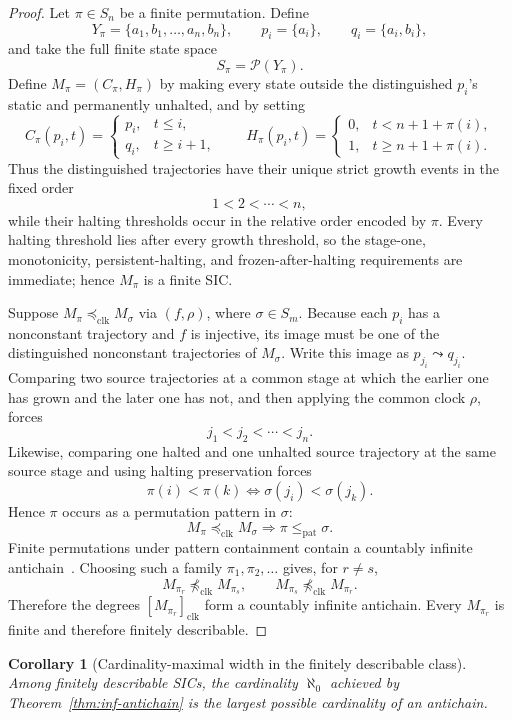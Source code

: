 \documentclass[11pt]{article}
\newtheorem{corollary}[definition]{Corollary}
\theoremstyle{remark}
\newcommand{\preclk}{\preceq_{\mathrm{clk}}}
\begin{document}
\begin{proof}
Let \(\pi\in S_n\) be a finite permutation. Define
\[
Y_\pi=\{a_1,b_1,\ldots,a_n,b_n\},
\qquad
p_i=\{a_i\},
\qquad
q_i=\{a_i,b_i\},
\]
and take the full finite state space
\[
S_\pi=\mathcal P(Y_\pi).
\]
Define \(M_\pi=(C_\pi,H_\pi)\) by making every state outside the distinguished \(p_i\)'s
static and permanently unhalted, and by setting
\[
C_\pi(p_i,t)=
\begin{cases}
p_i,&t\le i,\\
q_i,&t\ge i+1,
\end{cases}
\qquad
H_\pi(p_i,t)=
\begin{cases}
0,&t<n+1+\pi(i),\\
1,&t\ge n+1+\pi(i).
\end{cases}
\]
Thus the distinguished trajectories have their unique strict growth events in the fixed order
\[
1<2<\cdots<n,
\]
while their halting thresholds occur in the relative order encoded by \(\pi\).
Every halting threshold lies after every growth threshold, so the stage-one, monotonicity,
persistent-halting, and frozen-after-halting requirements are immediate; hence \(M_\pi\) is a finite SIC.

Suppose \(M_\pi\preclk M_\sigma\) via \((f,\rho)\), where \(\sigma\in S_m\).
Because each \(p_i\) has a nonconstant trajectory and \(f\) is injective,
its image must be one of the distinguished nonconstant trajectories of \(M_\sigma\).
Write this image as \(p_{j_i}\leadsto q_{j_i}\).
Comparing two source trajectories at a common stage at which the earlier one has grown and the
later one has not, and then applying the common clock \(\rho\), forces
\[
j_1<j_2<\cdots<j_n.
\]
Likewise, comparing one halted and one unhalted source trajectory at the same source stage and using
halting preservation forces
\[
\pi(i)<\pi(k)
\iff
\sigma(j_i)<\sigma(j_k).
\]
Hence \(\pi\) occurs as a permutation pattern in \(\sigma\):
\[
M_\pi\preclk M_\sigma
\Longrightarrow
\pi\le_{\mathrm{pat}}\sigma.
\]
Finite permutations under pattern containment contain a countably infinite antichain~\cite{SpielmanBona}.
Choosing such a family \(\pi_1,\pi_2,\ldots\) gives, for \(r\ne s\),
\[
M_{\pi_r}\not\preclk M_{\pi_s},
\qquad
M_{\pi_s}\not\preclk M_{\pi_r}.
\]
Therefore the degrees \([M_{\pi_r}]_{\mathrm{clk}}\) form a countably infinite antichain.
Every \(M_{\pi_r}\) is finite and therefore finitely describable.
\end{proof}

\begin{corollary}[Cardinality-maximal width in the finitely describable class]\label{cor:max-countable}
Among finitely describable SICs, the cardinality \(\aleph_0\) achieved by
Theorem~\ref{thm:inf-antichain} is the largest possible cardinality of an antichain.
\end{corollary}
\end{document}

